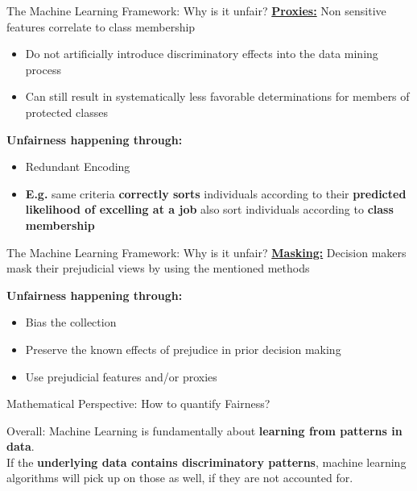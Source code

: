 \begin{frame}{The Machine Learning Framework: Why is it unfair? \cite{Barocas.2016, barocas-hardt-narayanan}}
    \underline{\textbf{Proxies:}} Non sensitive features correlate to class membership
    \begin{itemize}
        \item Do not artificially introduce discriminatory effects into the data mining process
        \item Can still result in systematically less favorable determinations for members of protected classes
    \end{itemize} 

    \begin{block}{\textbf{Unfairness happening through:}}
    \begin{itemize}
        \item  Redundant Encoding
        \item \textbf{E.g.} same criteria \textbf{correctly sorts} individuals according to their \textbf{predicted likelihood of excelling at a job} also sort individuals according to \textbf{class membership}
    \end{itemize}
        \end{block}
\end{frame}

\begin{frame}{The Machine Learning Framework: Why is it unfair? \cite{Barocas.2016, barocas-hardt-narayanan}}
    \underline{\textbf{Masking:}} Decision makers mask their prejudicial views by using the mentioned methods \newline 
    
    \begin{block}{\textbf{Unfairness happening through:}}
    \begin{itemize}
        \item Bias the collection
        \item Preserve the known effects of prejudice in prior decision making
        \item Use prejudicial features and/or proxies
    \end{itemize}
        \end{block}
\end{frame}

{
\begin{frame}{Mathematical Perspective: How to quantify Fairness? \cite{Berk.2018}}
\vspace{2cm}
\begin{block}{\huge Overall:}
\LARGE 
    Machine Learning is fundamentally about \textbf{learning from patterns in data}. \\
    If the \textbf{underlying data contains discriminatory patterns}, machine learning algorithms will pick up on those as well, if they are not accounted for.
\end{block}
\end{frame}
}